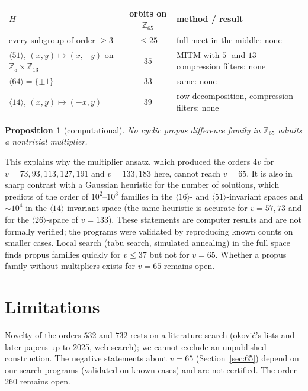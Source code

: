 \documentclass[11pt]{article}
\numberwithin{equation}{section}
\newtheorem{proposition}[theorem]{Proposition}
\theoremstyle{definition}
\theoremstyle{remark}
\newcommand{\Z}{\mathbb Z}
\begin{document}
\begin{center}
\begin{tabular}{lcl}
\toprule
$H$ & orbits on $\Z_{65}$ & method / result\\
\midrule
every subgroup of order $\ge3$ & $\le25$ & full meet-in-the-middle: none\\
$\langle51\rangle$, $(x,y)\mapsto(x,-y)$ on $\Z_5\times\Z_{13}$ & $35$ & MITM with $5$- and $13$-compression filters: none\\
$\langle64\rangle=\{\pm1\}$ & $33$ & same: none\\
$\langle14\rangle$, $(x,y)\mapsto(-x,y)$ & $39$ & row decomposition, compression filters: none\\
\bottomrule
\end{tabular}
\end{center}

\begin{proposition}[computational]
No cyclic propus difference family in $\Z_{65}$ admits a nontrivial multiplier.
\end{proposition}

This explains why the multiplier ansatz, which produced the orders $4v$ for $v=73,93,113,127,191$
\cite{BDK18,Dj22,Dj24} and $v=133,183$ here, cannot reach $v=65$. It is also in sharp contrast with a
Gaussian heuristic for the number of solutions, which predicts of the order of $10^{2}$--$10^{3}$
families in the $\langle16\rangle$- and $\langle51\rangle$-invariant spaces and $\sim10^{4}$ in the
$\langle14\rangle$-invariant space (the same heuristic is accurate for $v=57,73$ and for the
$\langle26\rangle$-space of $v=133$). These statements are computer results and are not formally
verified; the programs were validated by reproducing known counts on smaller cases. Local search
(tabu search, simulated annealing) in the full space finds propus families quickly for $v\le37$ but
not for $v=65$. Whether a propus family without multipliers exists for $v=65$ remains open.

\section{Limitations}
Novelty of the orders $532$ and $732$ rests on a literature search (\DJ{}okovi\'c's lists and later papers up to
2025, web search); we cannot exclude an unpublished construction. The negative statements about
$v=65$ (Section~\ref{sec:65}) depend on our search programs (validated on known cases) and are not certified. The order
$260$ remains open.
\end{document}
